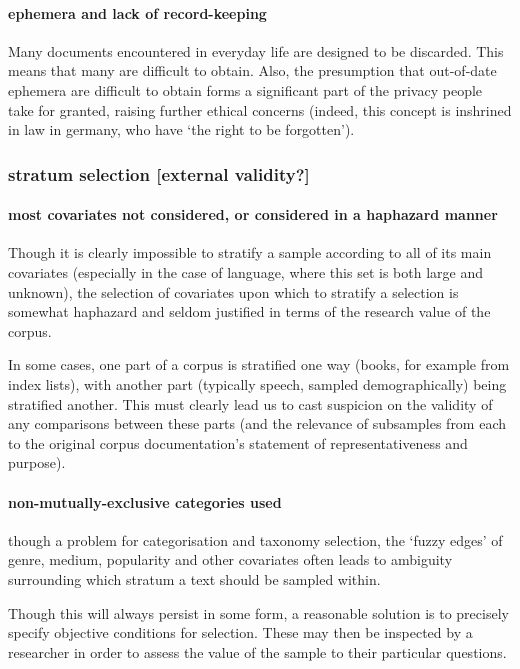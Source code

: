 \paragraph{ ephemera and lack of record-keeping}
Many documents encountered in everyday life are designed to be discarded. This means that many are difficult to obtain. Also, the presumption that out-of-date ephemera are difficult to obtain forms a significant part of the privacy people take for granted, raising further ethical concerns (indeed, this concept is inshrined in law in germany, who have `the right to be forgotten').


\subsubsection{stratum selection [external validity?]}

\paragraph{ most covariates not considered, or considered in a haphazard manner}
Though it is clearly impossible to stratify a sample according to all of its main covariates (especially in the case of language, where this set is both large and unknown), the selection of covariates upon which to stratify a selection is somewhat haphazard and seldom justified in terms of the research value of the corpus.

In some cases, one part of a corpus is stratified one way (books, for example from index lists), with another part (typically speech, sampled demographically) being stratified another. This must clearly lead us to cast suspicion on the validity of any comparisons between these parts (and the relevance of subsamples from each to the original corpus documentation's statement of representativeness and purpose).

\paragraph{ non-mutually-exclusive categories used}
though a problem for categorisation and taxonomy selection, the `fuzzy edges' of genre, medium, popularity and other covariates often leads to ambiguity surrounding which stratum a text should be sampled within.

Though this will always persist in some form, a reasonable solution is to precisely specify objective conditions for selection. These may then be inspected by a researcher in order to assess the value of the sample to their particular questions.


